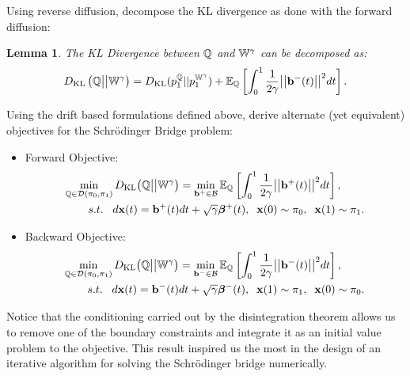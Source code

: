 \documentclass[a4paper,12pt,twoside,openright]{report}
\newtheorem{lemma}{Lemma}
\theoremstyle{definition}
\begin{document}
Using reverse diffusion, \cite{pavon1991free} decompose the KL divergence as done with the forward diffusion:
\begin{lemma}\label{lemma:control}\citep{pavon1991free}
    The KL Divergence between ${\mathbb{Q}}$ and $\mathbb{W}^{\gamma}$ can be decomposed as:
\begin{align}\label{eq:free_energy_2}
     D_{\mathrm{KL}}\left({\mathbb{Q}} \big|\big| \mathbb{W}^{\gamma}\right) = D_{\mathrm{KL}}(p^{{\mathbb{Q}}}_1 || p_1^{ \mathbb{W}^{\gamma}}) + \mathbb{E}_{\mathbb{Q}}\left[\int_0^1\frac{1}{2\gamma} \big|\big|{\mathbf{b}}^{-}(t)\big|\big|^2 dt\right].
\end{align}
\end{lemma}
Using the drift based formulations defined above, \cite{pavon1991free} derive alternate (yet equivalent) objectives for the Schrödinger Bridge problem:

\begin{itemize}
\item Forward Objective: 
\begin{align} \label{eq:controlled_bridge_forward}
    \min_{{\mathbb{Q}} \in {\mathcal{D}}(\pi_0, \pi_1)} D_{\mathrm{KL}}\big({\mathbb{Q}} \big|\big| \mathbb{W}^{\gamma}\big)& = \min_{{\mathbf{b}}^{+} \in {\mathcal{B}} }  \mathbb{E}_{\mathbb{Q}}\left[\int_0^1 \frac{1}{2\gamma}\big|\big|{\mathbf{b}}^{+}(t) \big|\big|^2 dt\right], \nonumber \\
    s.t.\;\;\; d{\mathbf{x}}(t) = {\mathbf{b}}^{+}(t) &dt + \sqrt{\gamma} {\bm{\beta}}^{+}(t), \;\; {\mathbf{x}}(0) \sim \pi_0, \;\; {\mathbf{x}}(1) \sim \pi_1.
\end{align}
\item Backward Objective:
\begin{align} \label{eq:controlled_bridge_backward}
    \min_{{\mathbb{Q}} \in {\mathcal{D}}(\pi_0, \pi_1)} D_{\mathrm{KL}}\big({\mathbb{Q}} \big|\big| \mathbb{W}^{\gamma}\big)& = \min_{{\mathbf{b}}^{-} \in {\mathcal{B}} }  \mathbb{E}_{\mathbb{Q}}\left[\int_0^1 \frac{1}{2\gamma}\big|\big|{\mathbf{b}}^{-}(t) \big|\big|^2 dt\right], \nonumber \\
    s.t.\;\;\; d{\mathbf{x}}(t) = {\mathbf{b}}^{-}(t) &dt + \sqrt{\gamma} {\bm{\beta}}^{-}(t), \;\; {\mathbf{x}}(1) \sim \pi_1 , \;\; {\mathbf{x}}(0) \sim \pi_0.
\end{align}
\end{itemize}
Notice that the conditioning carried out by the disintegration theorem allows us to remove one of the boundary constraints and integrate it as an initial value problem to the objective. This result inspired us the most in the design of an iterative algorithm for solving the Schrödinger bridge numerically. 
\end{document}
